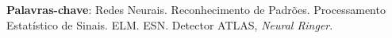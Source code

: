 \begin{resumo}


 \textbf{Palavras-chave}: Redes Neurais. Reconhecimento de Padrões. Processamento Estatístico de Sinais. ELM. ESN. Detector ATLAS, \textit{Neural Ringer}.
\end{resumo}

